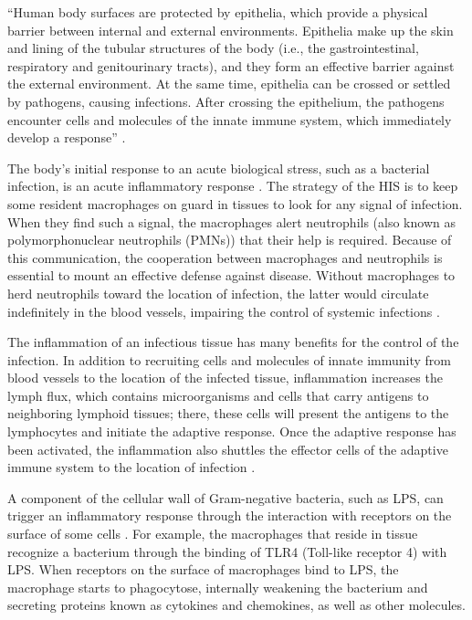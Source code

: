 \documentclass[10pt]{bmc_article}
\newenvironment{bmcformat}{\baselineskip20pt\sloppy\setboolean{publ}{false}}{\baselineskip20pt\sloppy}
\begin{document}
\begin{bmcformat}
``Human body surfaces are protected by epithelia, which provide a physical barrier between internal and external environments. 
Epithelia make up the skin and lining of the tubular structures of the body (i.e., the gastrointestinal, respiratory and genitourinary 
tracts), and they form an effective barrier against the external environment. At the same time, epithelia can be crossed or settled by 
pathogens, causing infections. After crossing the epithelium, the pathogens encounter cells and molecules of the innate immune system, 
which immediately develop a response'' \cite{janeway}.

The body's initial response to an acute biological stress, such as a bacterial infection, is an acute inflammatory 
response \cite{janeway}. The strategy of the HIS is to keep some resident macrophages on guard in tissues to look for any signal of 
infection. When they find such a signal, the macrophages alert neutrophils (also known as polymorphonuclear neutrophils (PMNs)) 
that their help is required. Because of this communication, the cooperation between macrophages and neutrophils is essential to 
mount an effective defense against disease. Without macrophages to herd neutrophils toward the location of infection, the latter 
would circulate indefinitely in the blood vessels, impairing the control of systemic infections \cite{Sompayrac2008}.

The inflammation of an infectious tissue has many benefits for the control of the infection. In addition to recruiting cells and 
molecules of innate immunity from blood vessels to the location of the infected tissue, inflammation increases the lymph flux, 
which contains microorganisms and cells that carry antigens to neighboring lymphoid tissues; there, these cells will present the 
antigens to the lymphocytes and initiate the adaptive response. Once the adaptive response has been activated, the inflammation 
also shuttles the effector cells of the adaptive immune system to the location of infection \cite{janeway}.

A component of the cellular wall of Gram-negative bacteria, such as LPS, can trigger an inflammatory response through the interaction 
with receptors on the surface of some cells \cite{Sompayrac2008}. For example, the macrophages that reside in tissue recognize a bacterium through the 
binding of TLR4 (Toll-like receptor 4) with LPS. When receptors on the surface of macrophages bind to LPS, the macrophage starts 
to phagocytose, internally weakening the bacterium and secreting proteins known as cytokines and chemokines, as well as other molecules. 


\end{bmcformat}
\end{document}
